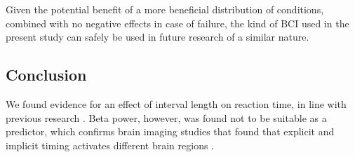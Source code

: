 \documentclass[man,floatsintext]{apa6} %
\begin{document}
Given the potential benefit of a more beneficial distribution of
conditions, combined with no negative effects in case of failure, the
kind of BCI used in the present study can safely be used in future
research of a similar nature.

\subsection{Conclusion}
We found evidence for an effect of interval length on reaction time,
in line with previous research \cite{naatanen_diminishing_1970,
  karlin_reaction_1959, drazin_effects_1961,
  grosjean_timing_2001}. Beta power, however, was found not to be
suitable as a predictor, which confirms brain imaging studies that
found that explicit and implicit timing activates different brain
regions \cite{coull_dissociating_2008}.










\end{document}
